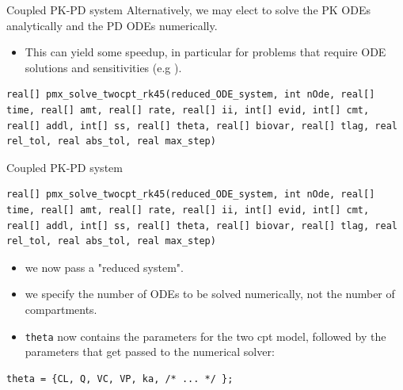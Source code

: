 \documentclass[presentation]{beamer}
\begin{document}
\begin{frame}[fragile,label={sec:orgc178159}]{Coupled PK-PD system}
 Alternatively, we may elect to solve the PK ODEs \textcolor{MRGGreen}{analytically} 
and the PD ODEs \textcolor{MRGGreen}{numerically}.
\begin{itemize}
\item This can yield some speedup, in particular for problems that require ODE solutions and sensitivities (e.g \cite{Margossian:2017b}).
\end{itemize}
\begin{verbatim}
real[] pmx_solve_twocpt_rk45(reduced_ODE_system, int nOde, real[] time, real[] amt, real[] rate, real[] ii, int[] evid, int[] cmt, real[] addl, int[] ss, real[] theta, real[] biovar, real[] tlag, real rel_tol, real abs_tol, real max_step)
\end{verbatim}
\end{frame}

\begin{frame}[fragile,label={sec:orgf45eb26}]{Coupled PK-PD system}
 \begin{verbatim}
real[] pmx_solve_twocpt_rk45(reduced_ODE_system, int nOde, real[] time, real[] amt, real[] rate, real[] ii, int[] evid, int[] cmt, real[] addl, int[] ss, real[] theta, real[] biovar, real[] tlag, real rel_tol, real abs_tol, real max_step)
\end{verbatim}
\begin{itemize}
\item we now pass a "reduced system".
\item we specify the number of ODEs to be solved numerically, not the number of compartments.
\item \texttt{theta} now contains the parameters for the two cpt model, followed by the parameters that get passed to the numerical solver:
\end{itemize}
\begin{verbatim}
theta = {CL, Q, VC, VP, ka, /* ... */ };
\end{verbatim}
\end{frame}
\end{document}
